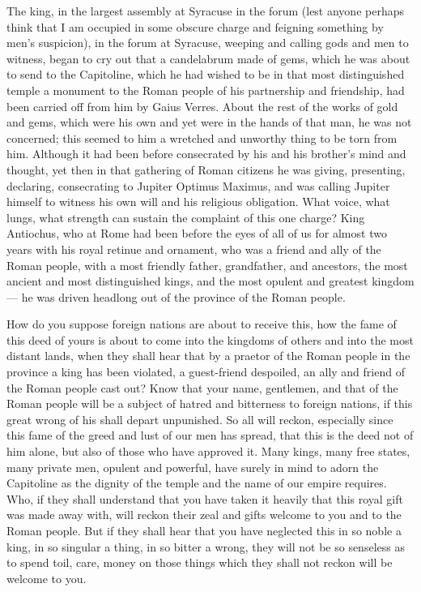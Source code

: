  The king, in the largest assembly at Syracuse in the forum (lest anyone perhaps think that I am occupied in some obscure charge and feigning something by men's suspicion), in the forum at Syracuse, weeping and calling gods and men to witness, began to cry out that a candelabrum made of gems, which he was about to send to the Capitoline, which he had wished to be in that most distinguished temple a monument to the Roman people of his partnership and friendship, had been carried off from him by Gaius Verres. About the rest of the works of gold and gems, which were his own and yet were in the hands of that man, he was not concerned; this seemed to him a wretched and unworthy thing to be torn from him. Although it had been before consecrated by his and his brother's mind and thought, yet then in that gathering of Roman citizens he was giving, presenting, declaring, consecrating to Jupiter Optimus Maximus, and was calling Jupiter himself to witness his own will and his religious obligation. What voice, what lungs, what strength can sustain the complaint of this one charge? King Antiochus, who at Rome had been before the eyes of all of us for almost two years with his royal retinue and ornament, who was a friend and ally of the Roman people, with a most friendly father, grandfather, and ancestors, the most ancient and most distinguished kings, and the most opulent and greatest kingdom --- he was driven headlong out of the province of the Roman people.

 How do you suppose foreign nations are about to receive this, how the fame of this deed of yours is about to come into the kingdoms of others and into the most distant lands, when they shall hear that by a praetor of the Roman people in the province a king has been violated, a guest-friend despoiled, an ally and friend of the Roman people cast out? Know that your name, gentlemen, and that of the Roman people will be a subject of hatred and bitterness to foreign nations, if this great wrong of his shall depart unpunished. So all will reckon, especially since this fame of the greed and lust of our men has spread, that this is the deed not of him alone, but also of those who have approved it. Many kings, many free states, many private men, opulent and powerful, have surely in mind to adorn the Capitoline as the dignity of the temple and the name of our empire requires. Who, if they shall understand that you have taken it heavily that this royal gift was made away with, will reckon their zeal and gifts welcome to you and to the Roman people. But if they shall hear that you have neglected this in so noble a king, in so singular a thing, in so bitter a wrong, they will not be so senseless as to spend toil, care, money on those things which they shall not reckon will be welcome to you.

